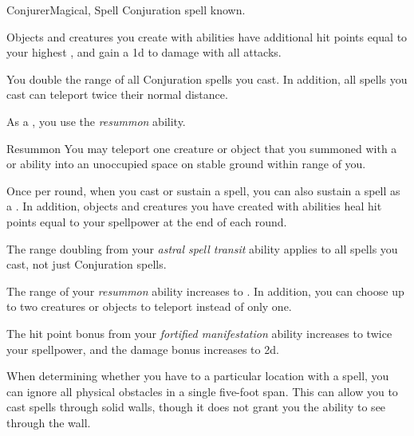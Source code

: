     \begin{feat}{Conjurer}{Magical, Spell}
        \featpre Conjuration spell known.

         Objects and creatures you create with  abilities have additional hit points equal to your highest , and gain a \plus1d  to damage with all attacks.

         You double the range of all Conjuration spells you cast.
        In addition, all  spells you cast can teleport twice their normal distance.

         As a , you use the \textit{resummon} ability.
        \begin{ability}{Resummon}
            You may teleport one creature or object that you summoned with a  or  ability into an unoccupied space on stable ground within \rngclose range of you.
        \end{ability}

         Once per round, when you cast or sustain a spell, you can also sustain a  spell as a .
        In addition, objects and creatures you have created with  abilities heal hit points equal to your spellpower at the end of each round.

         The range doubling from your \textit{astral spell transit} ability applies to all spells you cast, not just Conjuration spells.

         The range of your \textit{resummon} ability increases to \rngext.
        In addition, you can choose up to two creatures or objects to teleport instead of only one.

         The hit point bonus from your \textit{fortified manifestation} ability increases to twice your spellpower, and the damage bonus increases to \plus2d.

         When determining whether you have  to a particular location with a spell, you can ignore all physical obstacles in a single five-foot span.
        This can allow you to cast spells through solid walls, though it does not grant you the ability to see through the wall.
    \end{feat}

